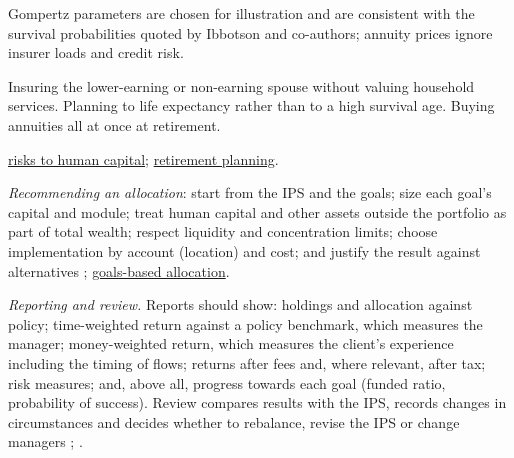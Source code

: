 \begin{qfmethod}
 Gompertz parameters are chosen for illustration and are consistent with the survival probabilities quoted by Ibbotson and co-authors; annuity prices ignore insurer loads and credit risk.

 Insuring the lower-earning or non-earning spouse without valuing household services. Planning to life expectancy rather than to a high survival age. Buying annuities all at once at retirement.

 \hyperref[meth:human-capital-risks]{risks to human capital}; \hyperref[meth:retirement-across-jurisdictions]{retirement planning}.

\end{qfmethod}

\begin{qfmethod}\label{meth:private-client-allocation-review}
 \emph{Recommending an allocation}: start from the IPS and the goals; size each goal's capital and module; treat human capital and other assets outside the portfolio as part of total wealth; respect liquidity and concentration limits; choose implementation by account (location) and cost; and justify the result against alternatives \citep[pp.~13--18]{ibbotson-lifetime-financial-advice-2007}; \hyperref[meth:goals-based-allocation-heuristics]{goals-based allocation}.

\emph{Reporting and review.} Reports should show: holdings and allocation against policy; time-weighted return against a policy benchmark, which measures the manager; money-weighted return, which measures the client's experience including the timing of flows; returns after fees and, where relevant, after tax; risk measures; and, above all, progress towards each goal (funded ratio, probability of success). Review compares results with the IPS, records changes in circumstances and decides whether to rebalance, revise the IPS or change managers \citep[pp.~21--22]{asset-manager-code-2010}; \citep[pp.~87--90]{standards-practice-handbook-2024}.


\end{qfmethod}
